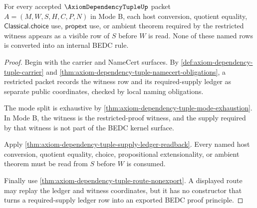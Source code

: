 \begin{theorem}
\label{thm:axiom-dependency-tuple-restricted-supply-ledger-exactness}
For every accepted $\AxiomDependencyTupleUp$ packet
$A=(M,W,S,H,C,P,N)$ in Mode B, each host conversion, quotient equality,
$\mathsf{Classical.choice}$ use, $\mathsf{propext}$ use, or ambient theorem
required by the restricted witness appears as a visible row of $S$ before
$W$ is read. None of these named rows is converted into an internal BEDC rule.
\end{theorem}
\begin{proof}
Begin with the carrier and NameCert surfaces. By
\autoref{def:axiom-dependency-tuple-carrier} and
\autoref{thm:axiom-dependency-tuple-namecert-obligations}, a restricted packet
records the witness row and its required-supply ledger as separate public
coordinates, checked by local naming obligations.

The mode split is exhaustive by
\autoref{thm:axiom-dependency-tuple-mode-exhaustion}. In Mode B, the witness is
the restricted-proof witness, and the supply required by that witness is not
part of the BEDC kernel surface.

Apply \autoref{thm:axiom-dependency-tuple-supply-ledger-readback}. Every named
host conversion, quotient equality, choice, propositional extensionality, or
ambient theorem must be read from $S$ before $W$ is consumed.

Finally use \autoref{thm:axiom-dependency-tuple-route-nonexport}. A displayed
route may replay the ledger and witness coordinates, but it has no constructor
that turns a required-supply ledger row into an exported BEDC proof principle.
\end{proof}

